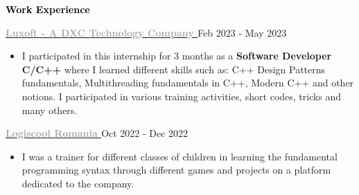 \documentclass[11pt, a4paper]{article}
\newcommand{\newsection}[2]{\Large\textbf{\textcolor{#2}{#1}} \hrulefill\normalsize} %
\newcommand{\newsubsection}[4]{\normalsize\textbf{\textcolor{#3}{#1}} \hfill\small\textcolor{#4}{#2}\normalsize} %
\newcommand{\customitem}{\vspace{-1.5mm}\item}
\newenvironment{cvsection}[2] %
{
    \newsection{#1}{#2}
    \vspace{1mm}
    \small
    
}
{
    \vspace{1mm}
}
\newenvironment{newentry}[5] %
{
    \newsubsection{#1}{#2}{#3}{#4}
    \small
    
    \textcolor{#4}{#5}
    \begin{itemize}
        \small
}
{
    \end{itemize}
}
\begin{document}
{\vspace{1mm}}
\begin{cvsection}{Work Experience}{black}
    {\vspace{1mm}}

        \begin{newentry}{\href{https://www.luxoft.com/}{\textcolor{darkgray}{Luxoft - A DXC Technology Company \faExternalLink}}}{Feb 2023 - May 2023}{darkgray}{mediumgray}{\vspace{-3mm}}
        \customitem I participated in this internship for 3 months as a \textbf{Software Developer C/C++} where I learned different skills such as: C++ Design Patterns fundamentals, Multithreading fundamentals in C++, Modern C++ and other notions. I participated in various training activities, short codes, tricks and many others.
    \end{newentry}

    \begin{newentry}{\href{https://www.luxoft.com/}{\textcolor{darkgray}{Logiscool Romania \faExternalLink}}}{Oct 2022 - Dec 2022}{darkgray}{mediumgray}{\vspace{-3mm}}
        \customitem I was a trainer for different classes of children in learning the fundamental programming syntax through different games and projects on a platform dedicated to the company.
    \end{newentry}

\end{cvsection}
    
\end{document}

